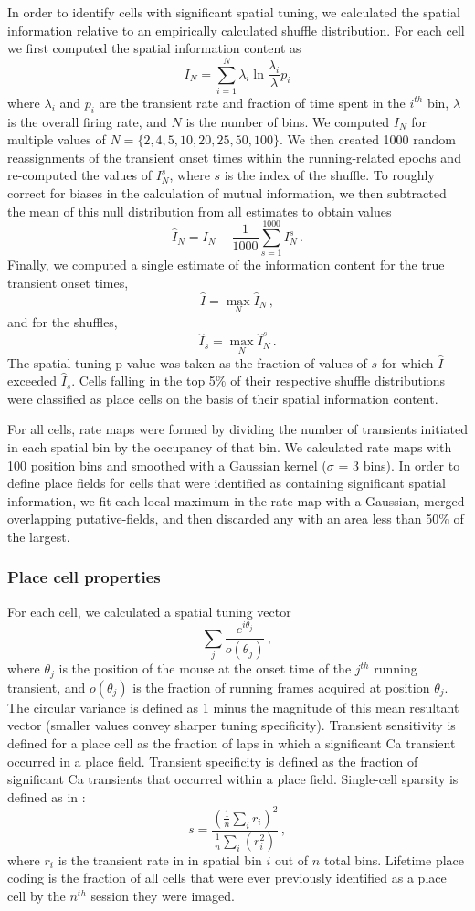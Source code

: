 In order to identify cells with significant spatial tuning, we calculated the spatial information relative to an empirically calculated shuffle distribution. For each cell we first computed the spatial information content \citep{Skaggs1993} as
$$I_N = \sum^N_{i=1}\lambda_i \ln\frac{\lambda_i}{\lambda}p_i$$
where $\lambda_i$ and $p_i$ are the transient rate and fraction of time spent in the $i^{th}$ bin, $\lambda$ is the overall firing rate, and $N$ is the number of bins. We computed $I_N$ for multiple values of $N = \{2, 4, 5, 10, 20, 25, 50, 100\}$. We then created 1000 random reassignments of the transient onset times within the running-related epochs and re-computed the values of $I^s_N$, where $s$ is the index of the shuffle. To roughly correct for biases in the calculation of mutual information, we then subtracted the mean of this null distribution from all estimates to obtain values $$\hat{I}_N = I_N - \frac{1}{1000}\sum^{1000}_{s=1}I^s_N\,.$$ Finally, we computed a single estimate of the information content for the true transient onset times,
$$\hat{I} = \max\limits_N{\hat{I}_N}\,,$$
and for the shuffles,
$$\hat{I}_s = \max\limits_N{\hat{I}_N^s}\,.$$
The spatial tuning p-value was taken as the fraction of values of $s$ for which $\hat{I}$ exceeded $\hat{I}_s$. Cells falling in the top 5$\%$ of their respective shuffle distributions were classified as place cells on the basis of their spatial information content.

For all cells, rate maps were formed by dividing the number of transients initiated in each spatial bin by the occupancy of that bin.  We calculated rate maps with 100 position bins and smoothed with a Gaussian kernel ($\sigma$ = 3 bins). In order to define place fields for cells that were identified as containing significant spatial information, we fit each local maximum in the rate map with a Gaussian, merged overlapping putative-fields, and then discarded any with an area less than 50$\%$ of the largest.

\subsubsection{Place cell properties}
For each cell, we calculated a spatial tuning vector
$$\sum_j\frac{e^{i\theta_j}}{o(\theta_j)}\,,$$
where $\theta_j$ is the position of the mouse at the onset time of the $j^{th}$ running transient, and $o(\theta_j)$ is the fraction of running frames acquired at position $\theta_j$. The circular variance is defined as 1 minus the magnitude of this mean resultant vector (smaller values convey sharper tuning specificity). Transient sensitivity is defined for a place cell as the fraction of laps in which a significant Ca transient occurred in a place field. Transient specificity is defined as the fraction of significant Ca transients that occurred within a place field. Single-cell sparsity is defined as in \citealt{Ahmed2009}:
$$s=\frac{(\frac{1}{n}\sum_ir_i)^2}{\frac{1}{n}\sum_i(r_i^2)}\,,$$
where $r_i$ is the transient rate in in spatial bin $i$ out of $n$ total bins. Lifetime place coding is the fraction of all cells that were ever previously identified as a place cell by the $n^{th}$ session they were imaged.

